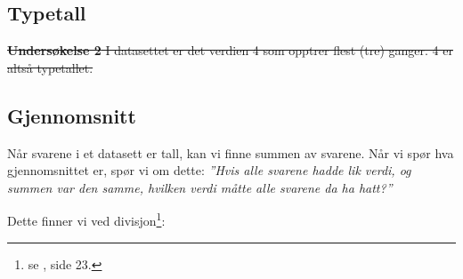 \subsection{Typetall}
 \regv
\st{
\textbf{Undersøkelse 2} \os
I datasettet er det verdien 4 som opptrer flest (tre) ganger. 4 er altså typetallet.
} 
\newpage
\subsection{Gjennomsnitt} \label{gjennomsnitt}
Når svarene i et datasett er tall, kan vi finne summen av svarene. Når vi spør hva gjennomsnittet er, spør vi om dette: \os
\textsl{''Hvis alle svarene hadde lik verdi, og summen var den samme, hvilken verdi måtte alle svarene da ha hatt?''}\os

Dette finner vi ved divisjon\footnote{se \mb, side 23.}: \regv

\reg[Gjennomsnitt]{
\[ \text{gjennomsnitt}=\frac{\text{summen av verdiene fra datasettet}}{\text{antall verdier}} \]
} \regv

